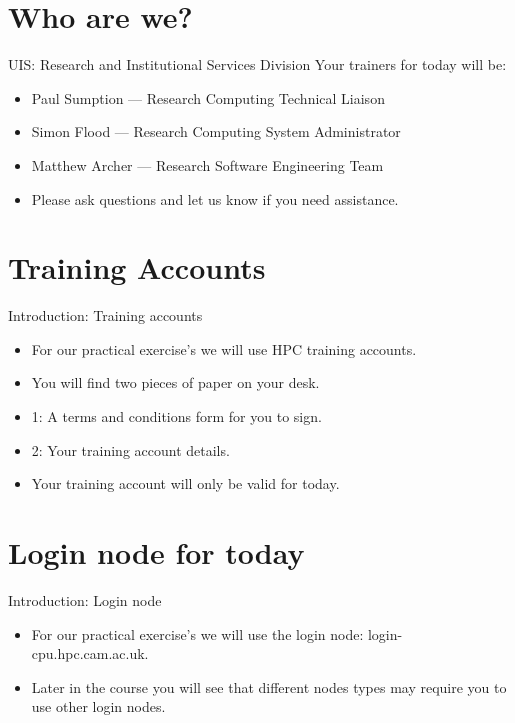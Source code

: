 \section{Who are we?}
\begin{frame}{UIS: Research and Institutional Services Division}
Your trainers for today will be:\\
\begin{itemize}
  \item Paul Sumption --- Research Computing Technical Liaison
    \item Simon Flood --- Research Computing System Administrator
  \item Matthew Archer --- Research Software Engineering Team
  \item\alert{Please ask questions and let us know if you need assistance.}
\end{itemize}
\end{frame}

\section{Training Accounts}
\begin{frame}{Introduction: Training accounts}
\begin{itemize}
\item{\alert{For our practical exercise's we will use HPC training accounts.}}
\pause
\item{You will find two pieces of paper on your desk.}
\pause
\item{1: A terms and conditions form for you to sign.}
\pause
\item{2: Your training account details.}
\pause
\item{Your training account will only be valid for today.}
\end{itemize}
\end{frame}

\section{Login node for today}
\begin{frame}{Introduction: Login node}
\begin{itemize}
\item{\alert{For our practical exercise's we will use the login node: login-cpu.hpc.cam.ac.uk.}}
\pause
\item{Later in the course you will see that different nodes types may require you to use other login nodes.}
\end{itemize}
\end{frame}

